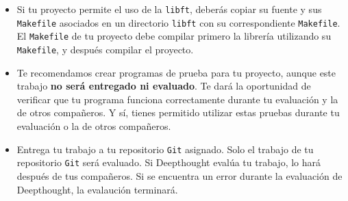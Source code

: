 \begin{itemize}
  \item Si tu proyecto permite el uso de la \texttt{libft}, deberás copiar su
    fuente y sus \texttt{Makefile} asociados en un directorio \texttt{libft}
    con su correspondiente \texttt{Makefile}. El \texttt{Makefile} de tu
    proyecto debe compilar primero la librería utilizando su \texttt{Makefile},
    y después compilar el proyecto.

  \item Te recomendamos crear programas de prueba para tu proyecto, aunque este
    trabajo \textbf{no será entregado ni evaluado}. Te dará la oportunidad de
    verificar que tu programa funciona correctamente durante tu evaluación y
    la de otros compañeros. Y sí, tienes permitido utilizar estas pruebas
    durante tu evaluación o la de otros compañeros.

  \item Entrega tu trabajo a tu repositorio \texttt{Git} asignado. Solo el
    trabajo de tu repositorio \texttt{Git} será evaluado. Si Deepthought evalúa
    tu trabajo, lo hará después de tus compañeros.
    Si se encuentra un error durante la evaluación de Deepthought, la evalaución
    terminará.
\end{itemize}
